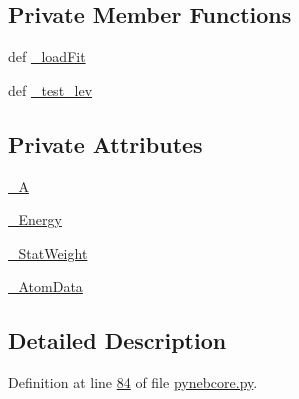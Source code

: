 \subsection*{Private Member Functions}
\begin{DoxyCompactItemize}
\item 
def \hyperlink{classpyneb_1_1core_1_1pynebcore_1_1___atom_data_fits_a1e92973091aaefa8b9985d3ca864dbd7}{\-\_\-load\-Fit}
\item 
def \hyperlink{classpyneb_1_1core_1_1pynebcore_1_1___atom_data_fits_a8e68300d05a33ee0bd949cbc5820e34c}{\-\_\-test\-\_\-lev}
\end{DoxyCompactItemize}
\subsection*{Private Attributes}
\begin{DoxyCompactItemize}
\item 
\hyperlink{classpyneb_1_1core_1_1pynebcore_1_1___atom_data_fits_a84351f8e5bae7c23f1318fe9464db1ca}{\-\_\-\-A}
\item 
\hyperlink{classpyneb_1_1core_1_1pynebcore_1_1___atom_data_fits_a465451be78113fc2ee30cf3ddabceadf}{\-\_\-\-Energy}
\item 
\hyperlink{classpyneb_1_1core_1_1pynebcore_1_1___atom_data_fits_a8bee4fc914c9542b85e4750eb63b7aa0}{\-\_\-\-Stat\-Weight}
\item 
\hyperlink{classpyneb_1_1core_1_1pynebcore_1_1___atom_data_fits_a778ab4d0dcd50a9d2f5aa54da07b51cc}{\-\_\-\-Atom\-Data}
\end{DoxyCompactItemize}


\subsection{Detailed Description}


Definition at line \hyperlink{pynebcore_8py_source_l00084}{84} of file \hyperlink{pynebcore_8py_source}{pynebcore.\-py}.



